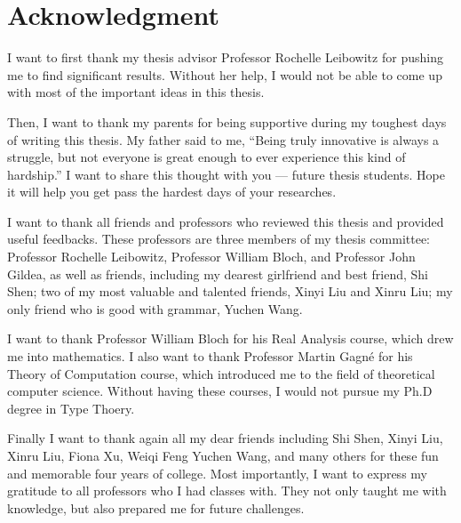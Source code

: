 \chapter{Acknowledgment}

I want to first thank my thesis advisor Professor
Rochelle Leibowitz for pushing me to find significant results.
Without her help,
I would not be able to come up with most of the important
ideas in this thesis.

Then, I want to thank my parents for being supportive
during my toughest days of writing this thesis.
My father said to me,
``Being truly innovative is always a struggle,
but not everyone is great enough
to ever experience this kind of hardship.''
I want to share this thought with you --- future thesis students.
Hope it will help you get pass
the hardest days of your researches.

I want to thank all friends and professors who
reviewed this thesis and provided useful feedbacks.
These professors are three members of my thesis committee:
Professor Rochelle Leibowitz,
Professor William Bloch,
and Professor John Gildea,
as well as friends, including
my dearest girlfriend and best friend, Shi Shen;
two of my most valuable and talented friends,
Xinyi Liu and Xinru Liu;
my only friend who is good with grammar, Yuchen Wang.

I want to thank Professor William Bloch
for his Real Analysis course,
which drew me into mathematics.
I also want to thank Professor Martin Gagné
for his Theory of Computation course,
which introduced me to the field of theoretical computer science.
Without having these courses,
I would not pursue my Ph.D degree in Type Thoery.

Finally I want to thank again all my dear friends
including Shi Shen, Xinyi Liu, Xinru Liu, Fiona Xu, Weiqi Feng
Yuchen Wang, and many others
for these fun and memorable four years of college.
Most importantly,
I want to express my gratitude to all professors
who I had classes with.
They not only taught me with knowledge,
but also prepared me for future challenges.
